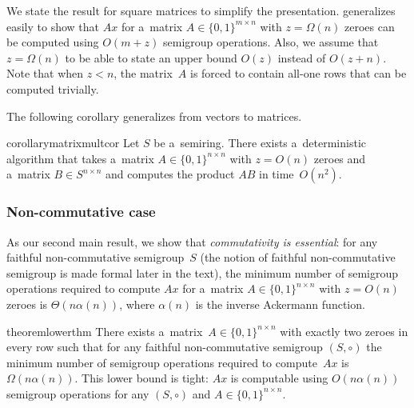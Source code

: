 \documentclass{toc}
\begin{document}
We state the result for square matrices to simplify the presentation.
 generalizes easily to show that $Ax$ for a~matrix
$A \in \{0,1\}^{m \times n}$ with $z=\Omega(n)$ zeroes can be computed using
$O(m+z)$ semigroup operations. Also, we assume that $z=\Omega(n)$ to be able to
state an upper bound $O(z)$ instead of $O(z+n)$. Note that when $z<n$, the
matrix~$A$ is forced to contain all-one rows that can be computed trivially.

The following corollary generalizes 
from vectors to matrices.

\begin{restatable}{corollary}{matrixmultcor}
\label{cor:matrixmultiplication}
Let $S$ be a~semiring. There exists a~deterministic algorithm that takes a~matrix
\linebreak${A \in \{0,1\}^{n \times n}}$ with $z=O(n)$ zeroes and a~matrix
$B \in S^{n \times n}$ and computes the product $AB$ in time~$O(n^2)$.
\end{restatable}

\subsubsection{Non-commutative case}


As our second main result, we show that \emph{commutativity is essential}: for
any faithful non-commutative semigroup~$S$
(the notion of faithful non-commutative semigroup  is made formal
later in the text),  %
the minimum number of semigroup operations
required to compute $Ax$ for a~matrix
$A \in \{0,1\}^{n \times n}$ with $z=O(n)$ zeroes is
$\Theta(n\alpha(n))$, where $\alpha(n)$ is the inverse Ackermann function.


\begin{restatable}{theorem}{lowerthm}
\label{thm:lowerbound}
There exists
a~matrix~$A \in \{0,1\}^{n \times n}$ with exactly two zeroes
in every row such that for any faithful non-commutative semigroup $(S, \circ)$
the minimum number of semigroup operations required to compute~$Ax$ is
$\Omega(n\alpha(n))$.
This lower bound is tight: $Ax$ is	computable using $O(n\alpha(n))$ semigroup
operations for any $(S, \circ)$ and $A\in \{0,1\}^{n \times n}$.
\end{restatable}
\end{document}
